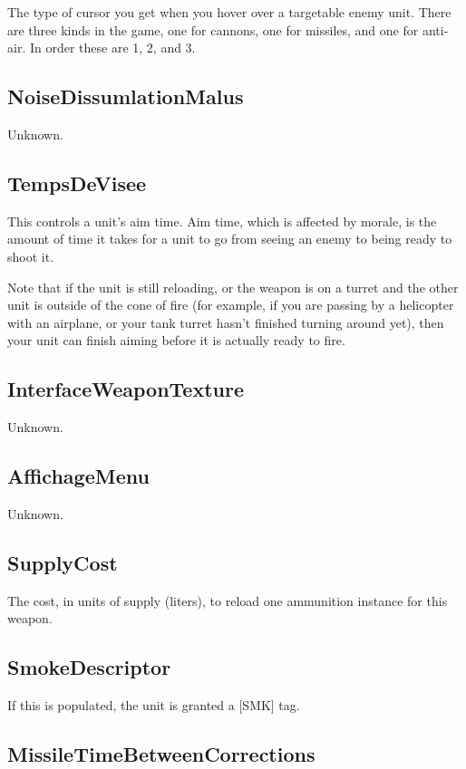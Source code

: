 \documentclass{article}
\begin{document}
The type of cursor you get when you hover over a targetable enemy unit. There are three kinds in the game, one for cannons, one for missiles, and one for anti-air. In order these are 1, 2, and 3.

\subsection{NoiseDissumlationMalus}

Unknown.

\subsection{TempsDeVisee}

This controls a unit's aim time. Aim time, which is affected by morale, is the amount of time it takes for a unit to go from seeing an enemy to being ready to shoot it.

Note that if the unit is still reloading, or the weapon is on a turret and the other unit is outside of the cone of fire (for example, if you are passing by a helicopter with an airplane, or your tank turret hasn't finished turning around yet), then your unit can finish aiming before it is actually ready to fire.

\subsection{InterfaceWeaponTexture}

Unknown.

\subsection{AffichageMenu}

Unknown.

\subsection{SupplyCost}

The cost, in units of supply (liters), to reload one ammunition instance for this weapon.

\subsection{SmokeDescriptor}

If this is populated, the unit is granted a [SMK] tag.

\subsection{MissileTimeBetweenCorrections}
\end{document}
